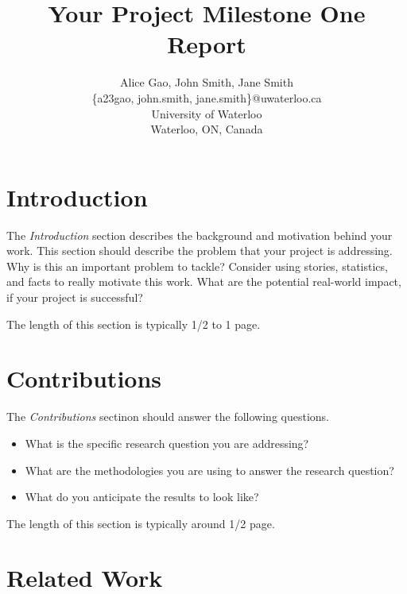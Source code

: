 \documentclass[letterpaper]{article} %
\begin{document}
%
\title{Your Project Milestone One Report}
\author{Alice Gao, John Smith, Jane Smith\\
\{a23gao, john.smith, jane.smith\}@uwaterloo.ca\\
University of Waterloo\\
Waterloo, ON, Canada\\
}
\maketitle



\section{Introduction}

The {\it Introduction} section describes the background and motivation behind your work.   This section should describe the problem that your project is addressing.  Why is this an important problem to tackle?   Consider using stories, statistics, and facts to really motivate this work.  What are the potential real-world impact, if your project is successful? 

The length of this section is typically 1/2 to 1 page.


\section{Contributions}

The {\it Contributions} sectinon should answer the following questions.
\begin{itemize}
    \item What is the specific research question you are addressing?
    \item What are the methodologies you are using to answer the research question? 
    \item What do you anticipate the results to look like? 
\end{itemize}

The length of this section is typically around 1/2 page.


\section{Related Work}
\end{document}

